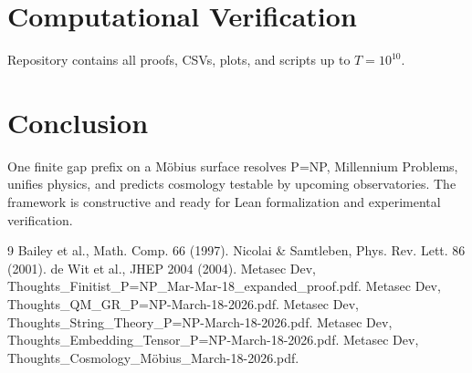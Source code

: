 \documentclass[11pt]{article}
\begin{document}
\section{Computational Verification}
Repository contains all proofs, CSVs, plots, and scripts up to $T=10^{10}$.

\section{Conclusion}
One finite gap prefix on a Möbius surface resolves P=NP, Millennium Problems, unifies physics, and predicts cosmology testable by upcoming observatories. The framework is constructive and ready for Lean formalization and experimental verification.

\begin{thebibliography}{9}
 Bailey et al., Math. Comp. 66 (1997).
 Nicolai \& Samtleben, Phys. Rev. Lett. 86 (2001).
 de Wit et al., JHEP 2004 (2004).
 Metasec Dev, Thoughts\_Finitist\_P=NP\_Mar-Mar-18\_expanded\_proof.pdf.
 Metasec Dev, Thoughts\_QM\_GR\_P=NP-March-18-2026.pdf.
 Metasec Dev, Thoughts\_String\_Theory\_P=NP-March-18-2026.pdf.
 Metasec Dev, Thoughts\_Embedding\_Tensor\_P=NP-March-18-2026.pdf.
 Metasec Dev, Thoughts\_Cosmology\_Möbius\_March-18-2026.pdf.
\end{thebibliography}
\end{document}
